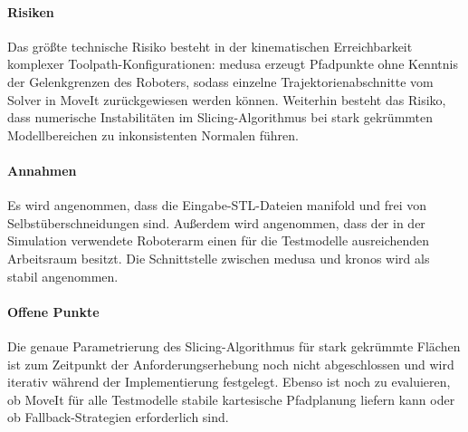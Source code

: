             \paragraph{Risiken}
            Das größte technische Risiko besteht in der kinematischen Erreichbarkeit komplexer Toolpath-Konfigurationen:
            \ac{medusa} erzeugt Pfadpunkte ohne Kenntnis der Gelenkgrenzen des Roboters, sodass einzelne Trajektorienabschnitte vom Solver in MoveIt zurückgewiesen werden können.
            Weiterhin besteht das Risiko, dass numerische Instabilitäten im Slicing-Algorithmus bei stark gekrümmten Modellbereichen zu inkonsistenten Normalen führen.

            \paragraph{Annahmen}
            Es wird angenommen, dass die Eingabe-\ac{STL}-Dateien manifold und frei von Selbstüberschneidungen sind.
            Außerdem wird angenommen, dass der in der Simulation verwendete Roboterarm einen für die Testmodelle ausreichenden Arbeitsraum besitzt.
            Die Schnittstelle zwischen \ac{medusa} und \ac{kronos} wird als stabil angenommen.

            \paragraph{Offene Punkte}
            Die genaue Parametrierung des Slicing-Algorithmus für stark gekrümmte Flächen ist zum Zeitpunkt der Anforderungserhebung noch nicht abgeschlossen
            und wird iterativ während der Implementierung festgelegt.
            Ebenso ist noch zu evaluieren, ob MoveIt für alle Testmodelle stabile kartesische Pfadplanung liefern kann oder ob Fallback-Strategien erforderlich sind.
            
